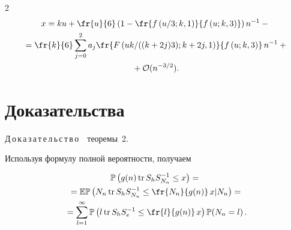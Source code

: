 \begin{multicols}{2}
\begin{multline*}


x=ku +  \fr{u}{6} \left(1-  \fr{f\left( u/3;k,1\right)}{f\left(u;k,3\right)} 


\right)n^{-1} - {}\\


{}=


\fr{k}{6} \sum\limits_{j=0}^{2} a_j  


\fr{F\left( {uk}/({(k+2j)3});k+2j,1\right)}{f\left(u;k,3\right)}\,n^{-1} + {}\\


{}+ \mathcal{O}(n^{- 3/2}).


\end{multline*}








\section{Доказательства}













\noindent


Д\,о\,к\,а\,з\,а\,т\,е\,л\,ь\,с\,т\,в\,о\ \ тео\-ре\-мы~2.





 Используя формулу полной вероятности, получаем


\begin{multline}


\label{pr1_1}


\mathbb{P} \left( g(n) \,\mathrm{tr} \,S_h S^{-1}_{N_n} \leq x \right) = {}\\


{}=


\mathbb{E}\mathbb{P} \left( N_n \,\textrm{tr}\, S_h S^{-1}_{N_n} \leq 


\fr{N_n}{g(n)}\,x  \vert  N_n \right) = {} \\


{}= \sum\limits_{l=1}^{\infty} \mathbb{P} \left( l \,\mathrm{tr}\,S_h S^{-1}_{e} \leq 


\fr{l}{g(n)}\,x \right)  \mathbb{P}(N_n=l)\,.


 \end{multline}






\end{multicols}
